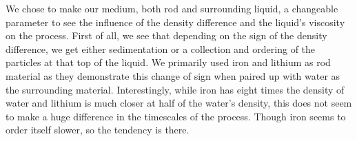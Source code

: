 
We chose to make our medium, both rod and surrounding liquid, a changeable parameter to see
the influence of the density difference and the liquid's viscosity on the process. First of all, we see
that depending on the sign of the density difference, we get either sedimentation or a collection and ordering of the particles at that top of the liquid. We primarily used iron and lithium as rod
material as they demonstrate this change of sign when paired up with water as the surrounding
material. Interestingly, while iron has eight times the density of water and lithium is much closer at half of the water’s density, this does not seem to make a huge difference in the timescales of the
process. Though iron seems to order itself slower, so the tendency is there.\\
\begin{figure}
  \begin{minipage}[t]{0.45\textwidth}
  \end{minipage}
  \hfill
  \begin{minipage}[t]{0.45\textwidth}

\end{minipage}
\end{figure}
